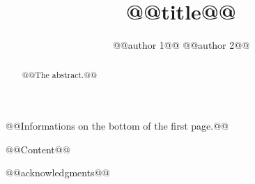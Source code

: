 \documentclass[prodmode,acmtecs]{acmsmall}
\begin{document}

\title{@@title@@}

\author{@@author 1@@
@@author 2@@
}

\begin{abstract}
@@The abstract.@@
\end{abstract}





\begin{bottomstuff}
@@Informations on the bottom of the first page.@@
\end{bottomstuff}

\maketitle

@@Content@@

\begin{acks}
@@acknowledgments@@
\end{acks}



\end{document}
